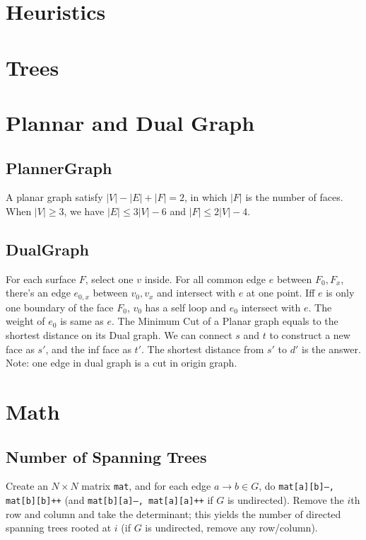 \section{Heuristics}

\section{Trees}

\section{Plannar and Dual Graph}
\subsection{PlannerGraph}
A planar graph satisfy $|V| - |E| + |F| = 2$, in which $|F|$ is the number of faces. 
When $|V| \geq 3$, we have $|E| \leq 3|V|-6$ and $|F|\leq 2|V|-4$. \\

\subsection{DualGraph}
For each surface $F$, select one $v$ inside. 
For all common edge $e$ between $F_0, F_x$, there's an edge $e_{0,x}$ between $v_0, v_x$ and intersect with $e$ at one point. 
Iff $e$ is only one boundary of the face $F_0$, $v_0$ has a self loop and $e_0$ intersect with $e$.  
The weight of $e_0$ is same as $e$.
The Minimum Cut of a Planar graph equals to the shortest distance on its Dual graph.
We can connect $s$ and $t$ to construct a new face as $s'$, and the inf face as $t'$. 
The shortest distance from $s'$ to $d'$ is the answer. 
Note: one edge in dual graph is a cut in origin graph.

\section{Math}
	\subsection{Number of Spanning Trees}
		Create an $N\times N$ matrix \texttt{mat}, and for each edge $a \rightarrow b \in G$, do
		\texttt{mat[a][b]--, mat[b][b]++} (and \texttt{mat[b][a]--, mat[a][a]++} if $G$ is undirected).
		Remove the $i$th row and column and take the determinant; this yields the number of directed spanning trees rooted at $i$
		(if $G$ is undirected, remove any row/column).

